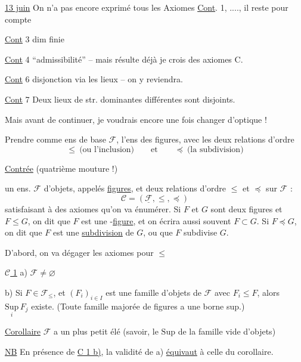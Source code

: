 
\uline{13 juin} On n'a pas encore exprimé tous les Axiomes \uline{Cont}. 1, ...., il reste pour compte

\uline{Cont} 3 dim finie

\uline{Cont} 4 ``admissibilité'' -- mais résulte déjà je crois des axiomes C.

\uline{Cont} 6  disjonction via les lieux -- on y reviendra.

\uline{Cont} 7 Deux lieux de str. dominantes différentes sont disjoints.

Mais avant de continuer, je voudrais encore une fois changer d'optique !

Prendre comme ens de base $\mathcal F$, l'ens des figures, avec les deux relations d'ordre \[ \leq\ \text{(ou l'inclusion)} \qquad \text{et}\qquad \preccurlyeq\ \text{(la subdivision)} \]

\uline{Contrée} (quatrième mouture !)

 un ens. $\mathcal F$ d'objets, appelés \uline{figures}, et deux relations d'ordre $\leq$ et $\preccurlyeq$ sur $\mathcal F$ : \[ \mathcal C=(\underline{\mathcal F},\leq,\preccurlyeq) \] satisfaisant à des axiomes\unsure{,|{}} qu'on va énumérer. Si $F$ et $G$ sont deux figures et $F\leq G$, on dit que $F$ est une -\uline{figure}, et on écrira aussi souvent $F\subset G$. Si $F\preccurlyeq G$, on dit que $F$ est une \uline{subdivision} de $G$, ou que $F$ subdivise $G$.


D'abord, on va dégager les axiomes pour $\leq$

\uline{$\mathcal C$ 1} a) $\mathcal F\ne\varnothing$

 b) Si $F\in\mathcal F_{\leq}$, et $(F_i)_{i\in I}$ est une famille d'objets de $\mathcal F$ avec $F_i\leq F$, alors $\underset{i}{\mathrm{Sup}}\,F_j$ existe. (Toute famille majorée de figures a une borne sup.)

\uline{Corollaire} $\mathcal F$ a un plus petit élé (savoir, le $\mathrm{Sup}$ de la famille vide d'objets)

\uline{NB} En présence de  \uline{C 1 b)}, la validité de a) \uline{équivaut} à celle du corollaire.


